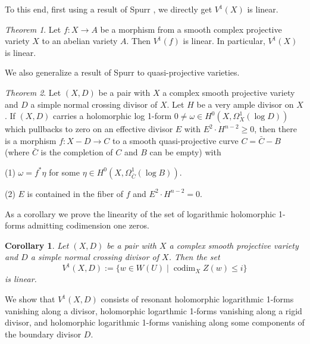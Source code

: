 \documentclass[a4paper,12pt,reqno]{amsart}
\theoremstyle{plain}
\newtheorem{corollary}[theorem]{Corollary}
\theoremstyle{remark}
\newcommand{\codim}{\operatorname{codim}}
\newtheorem{alphtheorem}{Theorem}
\begin{document}
To this end, first using a result of Spurr \cite{Sp88}, we directly get $V^1(X)$ is linear.

\begin{alphtheorem}
Let $f: X\to A$ be a morphism from a smooth complex projective variety $X$ to an abelian variety $A$. Then $V^1(f)$ is linear. In particular, $V^1(X)$ is linear.
\end{alphtheorem}


We also generalize a result of Spurr \cite{Sp88} to quasi-projective varieties. 

\begin{alphtheorem} \label{main3}
Let $(X, D)$ be a pair with $X$ a complex smooth projective variety and $D$ a simple normal crossing divisor of $X$. Let $H$ be a very ample divisor on $X$. If $(X, D)$ carries a holomorphic log 1-form $0\not=\omega\in H^0(X, \Omega_X^1(\log D))$  which pullbacks to zero on an effective divisor $E$ with $E^2\cdot H^{n-2}\geq0$, then there is a morphism $f: X-D\to C$ to a smooth quasi-projective curve $C=\bar{C}-B$ (where $\bar{C}$ is the completion of $C$ and $B$ can be empty) with 

(1)  $\omega=f^*\eta$ for some $\eta\in H^0(X, \Omega_{\bar{C}}^1(\log B))$.

(2) $E$ is contained in the fiber of $f$ and $E^2\cdot H^{n-2}=0$.
\end{alphtheorem}

As a corollary we prove the linearity of the set of logarithmic holomorphic 1-forms admitting codimension one zeros.

\begin{corollary}
Let $(X, D)$ be a pair with $X$ a complex smooth projective variety and $D$ a simple normal crossing divisor of $X$. Then the set $$ V^1(X,D):=\{ w \in W(U) \mid \codim_X Z(w) \leq i \}$$ is linear.
\end{corollary}

We show that $V^1(X,D)$ consists of resonant holomorphic logarithmic 1-forms vanishing along a divisor, holomorphic logarthmic 1-forms vanishing along a rigid divisor, and holomorphic logarithmic 1-forms vanishing along some components of the boundary divisor $D$.
\end{document}

